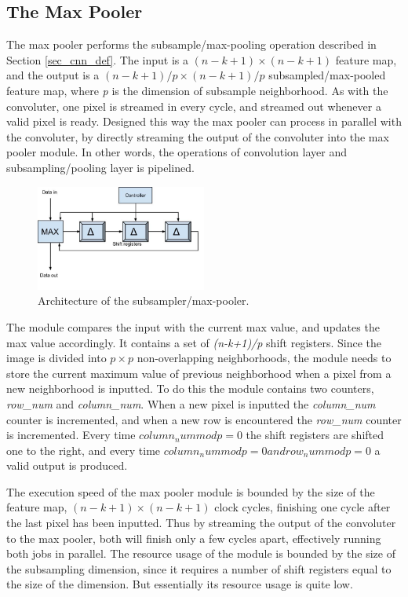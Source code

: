 \vspace*{1\baselineskip}
\subsection{The Max Pooler} \label{sec_max_pooler}

The max pooler performs the subsample/max-pooling operation described in Section \ref{sec_cnn_def}. The input is a $ (n-k+1) \times (n-k+1) $ feature map, and the output is a $ (n-k+1)/p \times (n-k+1)/p $ subsampled/max-pooled feature map, where \textit{p} is the dimension of subsample neighborhood. As with the convoluter, one pixel is streamed in every cycle, and streamed out whenever a valid pixel is ready. Designed this way the max pooler can process in parallel with the convoluter, by directly streaming the output of the convoluter into the max pooler module. In other words, the operations of convolution layer and subsampling/pooling layer is pipelined.

\begin{figure}[h!]
  \centering
      \includegraphics[width=0.5\textwidth]{Figures/Method/submax}
  \caption{Architecture of the subsampler/max-pooler.}
\end{figure}

The module compares the input with the current max value, and updates the max value accordingly. It contains a set of \textit{(n-k+1)/p} shift registers. Since the image is divided into $ p \times p $ non-overlapping neighborhoods, the module needs to store the current maximum value of previous neighborhood when a pixel from a new neighborhood is inputted. To do this the module contains two counters, \textit{row\_num} and \textit{column\_num}. When a new pixel is inputted the \textit{column\_num} counter is incremented, and when a new row is encountered the \textit{row\_num} counter is incremented. Every time $ column_num mod p = 0 $ the shift registers are shifted one to the right, and every time $ column_num mod p = 0 and row_num mod p = 0 $ a valid output is produced. 



The execution speed of the max pooler module is bounded by the size of the feature map, $ (n-k+1) \times (n-k+1) $ clock cycles, finishing one cycle after the last pixel has been inputted. 
Thus by streaming the output of the convoluter to the max pooler, both will finish only a few cycles apart, effectively running both jobs in parallel. The resource usage of the module is bounded by the size of the subsampling dimension, since it requires a number of shift registers equal to the size of the dimension. But essentially its resource usage is quite low.  
